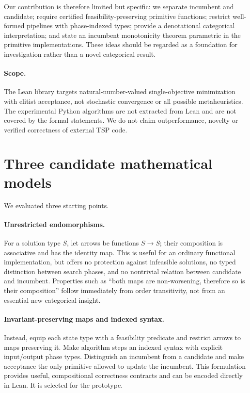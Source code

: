 \documentclass[11pt,a4paper]{article}
\begin{document}
Our contribution is therefore limited but specific: we separate incumbent
and candidate; require certified feasibility-preserving primitive functions;
restrict well-formed pipelines with phase-indexed types; provide a denotational
categorical interpretation; and state an incumbent monotonicity theorem
parametric in the primitive implementations. These ideas should be regarded
as a foundation for investigation rather than a novel categorical result.

\paragraph{Scope.}
The Lean library targets natural-number-valued single-objective minimization
with elitist acceptance, not stochastic convergence or all possible
metaheuristics. The experimental Python algorithms are not extracted from
Lean and are not covered by the formal statements. We do not claim
outperformance, novelty or verified correctness of external TSP code.

\section{Three candidate mathematical models}
We evaluated three starting points.

\paragraph{Unrestricted endomorphisms.}
For a solution type $S$, let arrows be functions $S\to S$; their composition
is associative and has the identity map. This is useful for an ordinary
functional implementation, but offers no protection against infeasible
solutions, no typed distinction between search phases, and no nontrivial
relation between candidate and incumbent. Properties such as ``both maps
are non-worsening, therefore so is their composition'' follow immediately
from order transitivity, not from an essential new categorical insight.

\paragraph{Invariant-preserving maps and indexed syntax.}
Instead, equip each state type with a feasibility predicate and restrict
arrows to maps preserving it. Make algorithm steps an indexed syntax with
explicit input/output phase types. Distinguish an incumbent from a candidate
and make acceptance the only primitive allowed to update the incumbent.
This formulation provides useful, compositional correctness contracts and
can be encoded directly in Lean. It is selected for the prototype.
\end{document}
